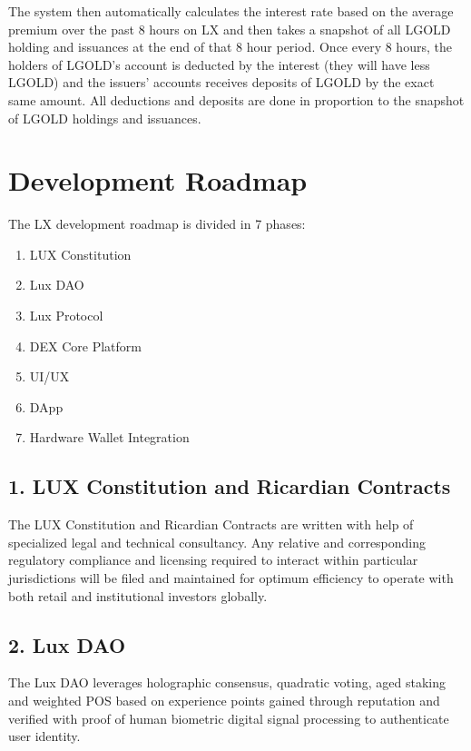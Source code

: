 \documentclass[11pt]{article}
\begin{document}
The system then automatically calculates the interest rate based on the average premium over the past 8 hours on LX and then takes a snapshot of all LGOLD holding and issuances at the end of that 8 hour period. Once every 8 hours, the holders of LGOLD's account is deducted by the interest (they will have less LGOLD) and the issuers' accounts receives deposits of LGOLD by the exact same amount. All deductions and deposits are done in proportion to the snapshot of LGOLD holdings and issuances.


\section{Development Roadmap}

The LX development roadmap is divided in 7 phases:

\begin{enumerate}
  \item LUX Constitution
  \item Lux DAO
  \item Lux Protocol
  \item DEX Core Platform
  \item UI/UX
  \item DApp
  \item Hardware Wallet Integration
\end{enumerate}

\subsection{1. LUX Constitution and Ricardian Contracts}

The LUX Constitution and Ricardian Contracts are written with help of specialized legal and technical consultancy. Any relative and corresponding regulatory compliance and licensing required to interact within particular jurisdictions will be filed and maintained for optimum efficiency to operate with both retail and institutional investors globally.


\subsection{2. Lux DAO}

The Lux DAO leverages holographic consensus, quadratic voting, aged staking and weighted POS based on experience points gained through reputation and verified with proof of human biometric digital signal processing to authenticate user identity.
\end{document}
